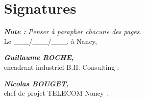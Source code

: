\section{Signatures}

\emph{\textbf{Note :} Penser à parapher chacune des pages.}\\

Le \_\_\_/\_\_\_/\_\_\_, à Nancy,\\

\begin{multicols}{2}
	\begin{flushleft}
		\textbf{\emph{Guillaume ROCHE,}}\\
		encadrant industriel B.H. Consulting :
	\end{flushleft}

	\begin{flushright}
		\textbf{\emph{Nicolas BOUGET,}}\\
		chef de projet TELECOM Nancy :
	\end{flushright}
\end{multicols}

